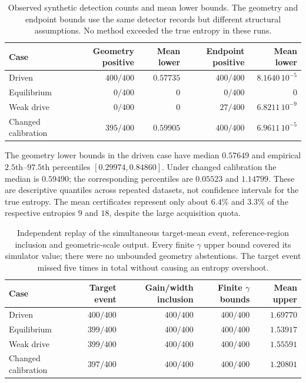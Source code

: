 \begin{table}[htbp]
\centering
\small
\begin{tabular}{lrrrr}
\hline
Case & Geometry positive & Mean lower & Endpoint positive & Mean lower\\
\hline
Driven & $400/400$ & $0.57735$ & $400/400$ & $8.1640\,10^{-5}$\\
Equilibrium & $0/400$ & $0$ & $0/400$ & $0$\\
Weak drive & $0/400$ & $0$ & $27/400$ & $6.8211\,10^{-9}$\\
Changed calibration & $395/400$ & $0.59905$ & $400/400$ & $6.9611\,10^{-5}$\\
\hline
\end{tabular}
\caption{Observed synthetic detection counts and mean lower bounds.  The
geometry and endpoint bounds use the same detector records but different
structural assumptions.  No method exceeded the true entropy in these runs.}
\label{tab:dc-benchmark-outcomes}
\end{table}

The geometry lower bounds in the driven case have median $0.57649$ and
empirical $2.5$th--$97.5$th percentiles $[0.29974,0.84860]$.  Under changed
calibration the median is $0.59490$; the corresponding percentiles are
$0.05523$ and $1.14799$.  These are descriptive quantiles across repeated
datasets, not confidence intervals for the true entropy.  The mean
certificates represent only about $6.4\%$ and $3.3\%$ of the respective
entropies $9$ and $18$, despite the large acquisition quota.

\begin{table}[htbp]
\centering
\small
\begin{tabular}{lrrrr}
\hline
Case & Target event & Gain/width inclusion & Finite $\gamma$ bounds & Mean upper\\
\hline
Driven & $400/400$ & $400/400$ & $400/400$ & $1.69770$\\
Equilibrium & $399/400$ & $400/400$ & $400/400$ & $1.53917$\\
Weak drive & $399/400$ & $400/400$ & $400/400$ & $1.55591$\\
Changed calibration & $397/400$ & $400/400$ & $400/400$ & $1.20801$\\
\hline
\end{tabular}
\caption{Independent replay of the simultaneous target-mean event,
reference-region inclusion and geometric-scale output.  Every finite
$\gamma$ upper bound covered its simulator value; there were no unbounded
geometry abstentions.  The target event missed five times in total without
causing an entropy overshoot.}
\label{tab:dc-benchmark-coverage}
\end{table}

